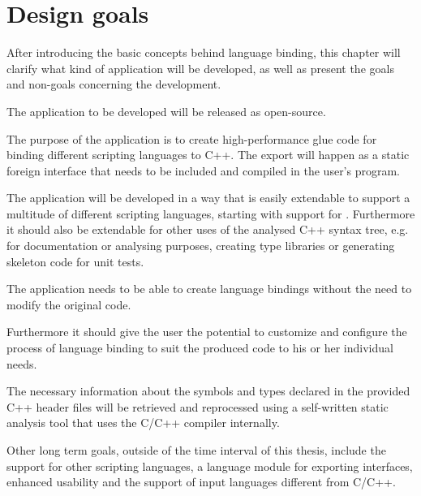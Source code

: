 \chapter{Design goals}
\label{chap:DesignGoals}

After introducing the basic concepts behind language binding, this chapter will clarify what kind of application will be developed, as well as present the goals and non-goals concerning the development.

The application to be developed will be released as open-source.

The purpose of the application is to create high-performance glue code for binding different scripting languages to C++. The export will happen as a static foreign interface that needs to be included and compiled in the user's program.

The application will be developed in a way that is easily extendable to support a multitude of different scripting languages, starting with support for . Furthermore it should also be extendable for other uses of the analysed C++ syntax tree, e.g. for documentation or analysing purposes, creating type libraries or generating skeleton code for unit tests.

The application needs to be able to create language bindings without the need to modify the original code.

Furthermore it should give the user the potential to customize and configure the process of language binding to suit the produced code to his or her individual needs.

The necessary information about the symbols and types declared in the provided C++ header files will be retrieved and reprocessed using a self-written static analysis tool that uses the  C/C++ compiler internally.

Other long term goals, outside of the time interval of this thesis, include the support for other scripting languages, a language module for exporting  interfaces, enhanced usability and the support of input languages different from C/C++.
